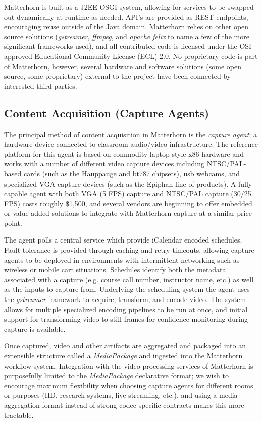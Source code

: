 \documentclass{sig-alternate}
\begin{document}
Matterhorn is built as a J2EE OSGI system, allowing for services to be swapped out dynamically at runtime as needed.  API's are provided as REST endpoints, encouraging reuse outside of the Java domain.  Matterhorn relies on other open source solutions (\emph{gstreamer}, \emph{ffmpeg}, and \emph{apache felix} to name a few of the more significant frameworks used), and all contributed code is licensed under the OSI approved Educational Community License (ECL) 2.0.  No proprietary code is part of Matterhorn, however, several hardware and software solutions (some open source, some proprietary) external to the project have been connected by interested third parties.

\subsection{Content Acquisition (Capture Agents)}
The principal method of content acquisition in Matterhorn is the \emph{capture agent}; a hardware device connected to classroom audio/video infrastructure.  The reference platform for this agent is based on commodity laptop-style x86 hardware and works with a number of different video capture devices including NTSC/PAL-based cards (such as the Hauppauge and bt787 chipsets), usb webcams, and specialized VGA capture devices (such as the Epiphan line of products).  A fully capable agent with both VGA (5 FPS) capture and NTSC/PAL capture (30/25 FPS) costs roughly \$1,500, and several vendors are beginning to offer embedded or value-added solutions to integrate with Matterhorn capture at a similar price point.

The agent polls a central service which provide iCalendar encoded schedules.  Fault tolerance is provided through caching and retry timeouts, allowing capture agents to be deployed in environments with intermittent networking such as wireless or mobile cart situations.  Schedules identify both the metadata associated with a capture (e.g. course call number, instructor name, etc.) as well as the inputs to capture from.  Underlying the scheduling system the agent uses the \emph{gstreamer} framework to acquire, transform, and encode video.  The system allows for multiple specialized encoding pipelines to be run at once, and initial support for transforming video to still frames for confidence monitoring during capture is available.

Once captured, video and other artifacts are aggregated and packaged into an extensible structure called a \emph{MediaPackage} and ingested into the Matterhorn workflow system.  Integration with the video processing services of Matterhorn is purposefully limited to the \emph{MediaPackage} declarative format; we wish to encourage maximum flexibility when choosing capture agents for different rooms or purposes (HD, research systems, live streaming, etc.), and using a media aggregation format instead of strong codec-specific contracts makes this more tractable.
\end{document}
